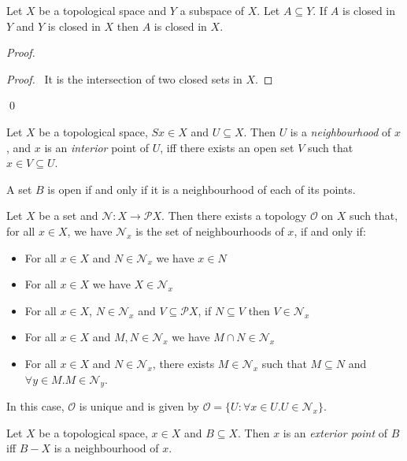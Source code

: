 \begin{prop}
Let $X$ be a topological space and $Y$ a subspace of $X$. Let $A \subseteq Y$. If $A$ is closed in $Y$ and $Y$ is closed in $X$ then $A$ is closed in $X$.
\end{prop}

\begin{proof}
\pf
{}
\begin{proof}
	\pf\ It is the intersection of two closed sets in $X$.
\end{proof}
\qed
\end{proof}

\begin{df}[Neighbourhood]
Let $X$ be a topological space, $Sx \in X$ and $U \subseteq X$. Then $U$ is a \emph{neighbourhood} of $x$, and $x$ is an \emph{interior} point of $U$, iff there exists an open set $V$ such that $x \in V \subseteq U$.
\end{df}

\begin{prop}
A set $B$ is open if and only if it is a neighbourhood of each of its points.
\end{prop}

\begin{prop}
Let $X$ be a set and $\mathcal{N} : X \rightarrow \mathcal{P} X$. Then there exists a topology $\mathcal{O}$ on $X$ such that, for all $x \in X$, we have $\mathcal{N}_x$ is the set of neighbourhoods of $x$, if and only if:
\begin{itemize}
\item For all $x \in X$ and $N \in \mathcal{N}_x$ we have $x \in N$
\item For all $x \in X$ we have $X \in \mathcal{N}_x$
\item For all $x \in X$, $N \in \mathcal{N}_x$ and $V \subseteq \mathcal{P} X$, if $N \subseteq V$ then $V \in \mathcal{N}_x$
\item For all $x \in X$ and $M, N \in \mathcal{N}_x$ we have $M \cap N \in \mathcal{N}_x$
\item For all $x \in X$ and $N \in \mathcal{N}_x$, there exists $M \in \mathcal{N}_x$ such that $M \subseteq N$ and $\forall y \in M. M \in \mathcal{N}_y$.
\end{itemize}
In this case, $\mathcal{O}$ is unique and is given by $\mathcal{O} = \{ U : \forall x \in U. U \in \mathcal{N}_x \}$.
\end{prop}

\begin{df}
Let $X$ be a topological space, $x \in X$ and $B \subseteq X$. Then $x$ is an \emph{exterior point} of $B$ iff $B - X$ is a neighbourhood of $x$.
\end{df}

